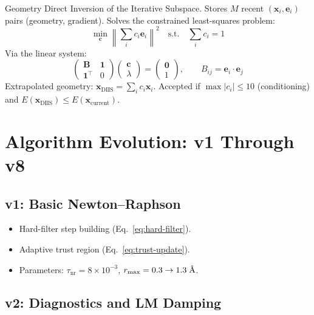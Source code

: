 \documentclass[11pt,a4paper]{article}
\newcommand{\vect}[1]{\mathbf{#1}}
\newcommand{\mat}[1]{\mathbf{#1}}
\newcommand{\angstrom}{\text{\r{A}}}
\begin{document}
Geometry Direct Inversion of the Iterative Subspace. Stores $M$ recent $(\vect{x}_i, \vect{e}_i)$ pairs (geometry, gradient). Solves the constrained least-squares problem:
\begin{equation}
  \min_{\vect{c}} \left\|\sum_i c_i \vect{e}_i\right\|^2 \quad \text{s.t.} \quad \sum_i c_i = 1
  \label{eq:gdiis}
\end{equation}
Via the linear system:
\begin{equation}
  \begin{pmatrix} \mat{B} & \vect{1} \\ \vect{1}^\top & 0 \end{pmatrix}
  \begin{pmatrix} \vect{c} \\ \lambda \end{pmatrix}
  = \begin{pmatrix} \vect{0} \\ 1 \end{pmatrix}, \qquad
  B_{ij} = \vect{e}_i \cdot \vect{e}_j
  \label{eq:gdiis-system}
\end{equation}
Extrapolated geometry: $\vect{x}_\text{DIIS} = \sum_i c_i \vect{x}_i$. Accepted if $\max|c_i| \leq 10$ (conditioning) and $E(\vect{x}_\text{DIIS}) \leq E(\vect{x}_\text{current})$.

\section{Algorithm Evolution: v1 Through v8}
\label{sec:evolution}

\subsection{v1: Basic Newton--Raphson}

\begin{itemize}
  \item Hard-filter step building (Eq.~\ref{eq:hard-filter}).
  \item Adaptive trust region (Eq.~\ref{eq:trust-update}).
  \item Parameters: $\tau_\text{nr} = 8 \times 10^{-3}$, $r_\text{max} = 0.3 \to 1.3\;\angstrom$.
\end{itemize}

\subsection{v2: Diagnostics and LM Damping}
\end{document}
